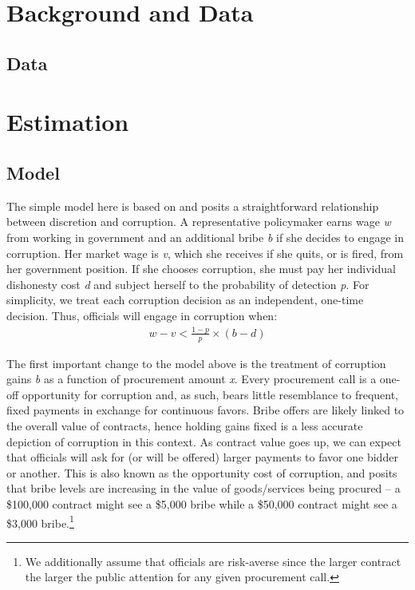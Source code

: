 \documentclass[11pt]{article}
\begin{document}
\section{Background and Data} \label{sec:background}

\subsection{Data} \label{subsec:data}

\section{Estimation} \label{sec:methodology}
\subsection{Model} \label{subsec:model}
The simple model here is based on \citet{OlkenCorruptionDevelopingCountries2012b} and posits a straightforward relationship between discretion and corruption. A representative policymaker earns wage \emph{w} from working in government and an additional bribe \emph{b} if she decides to engage in corruption. Her market wage is \emph{v}, which she receives if she quits, or is fired, from her government position. If she chooses corruption, she must pay her individual dishonesty cost \emph{d} and subject herself to the probability of detection \emph{p}. For simplicity, we treat each corruption decision as an independent, one-time decision. Thus, officials will engage in corruption when:
\begin{equation} \label{eq:simplemodel}
  \begin{split}
    w - v < \frac{1-p}{p}\times(b-d)
  \end{split}
\end{equation}

The first important change to the model above is the treatment of corruption gains \emph{b} as a function of procurement amount \emph{x}. Every procurement call is a one-off opportunity for corruption and, as such, bears little resemblance to frequent, fixed payments in exchange for continuous favors. Bribe offers are likely linked to the overall value of contracts, hence holding gains fixed \citep{OlkenCorruptionDevelopingCountries2012b} is a less accurate depiction of corruption in this context. As contract value goes up, we can expect that officials will ask for (or will be offered) larger payments to favor one bidder or another. This is also known as the opportunity cost of corruption, and posits that bribe levels are increasing in the value of goods/services being procured -- a \$100,000 contract might see a \$5,000 bribe while a \$50,000 contract might see a \$3,000 bribe.\footnote{We additionally assume that officials are risk-averse since the larger contract the larger the public attention for any given procurement call.}
\end{document}
